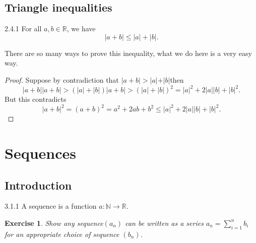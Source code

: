 \documentclass[a4paper]{article}
\def\rr{{\mathbb R}}
\def\nn{{\mathbb N}}
\newtheorem{exercise}{Exercise}[subsection]
\begin{document}
\subsection{Triangle inequalities}
\begin{theorem}{2.4.1}{}
    For all $a,b\in \rr$, we have 
    \begin{equation*}
        |a+b\vert \leq |a\vert +|b\vert .
    \end{equation*}
\end{theorem}
There are so many ways to prove this inequality, what we do here is a very easy way.
\begin{proof}
    Suppose by contradiction that $|a+b\vert >|a|+|b| $then
    \begin{equation*}
        |a+b||a+b|>(|a|+|b|)|a+b|>(|a|+|b|)^2=|a|^2+2|a||b|+|b|^2.
    \end{equation*}
    But this contradicts
    \begin{equation*}
        |a+b|^2=(a+b)^2=a^2+2ab+b^2\leq |a|^2+2|a||b|+|b|^2.
    \end{equation*}
\end{proof}
\newpage
\section{Sequences}
\subsection{Introduction}
\begin{definition}{3.1.1}{}
    A sequence is a function $a:\nn \rightarrow \rr$.
\end{definition}
\begin{exercise}
    Show any sequence$(a_n)$ can be written as a series $a_n=\sum_{i=1}^n b_i$ for an appropriate choice of sequence $(b_n)$.
\end{exercise}
\end{document}
